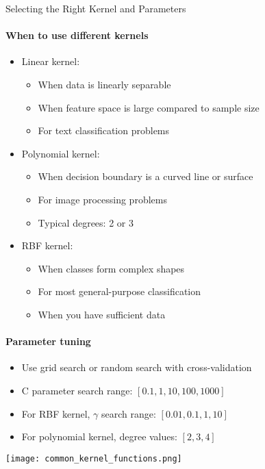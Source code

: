 \begin{KR}{Selecting the Right Kernel and Parameters}

    \begin{minipage}{0.7\linewidth}
\paragraph{When to use different kernels}
\begin{itemize}
    \item Linear kernel: 
    \begin{itemize}
        \item When data is linearly separable
        \item When feature space is large compared to sample size
        \item For text classification problems
    \end{itemize}
    \item Polynomial kernel:
    \begin{itemize}
        \item When decision boundary is a curved line or surface
        \item For image processing problems
        \item Typical degrees: 2 or 3
    \end{itemize}
    \item RBF kernel:
    \begin{itemize}
        \item When classes form complex shapes
        \item For most general-purpose classification
        \item When you have sufficient data
    \end{itemize}
\end{itemize}

\paragraph{Parameter tuning}
\begin{itemize}
    \item Use grid search or random search with cross-validation
    \item C parameter search range: $[0.1, 1, 10, 100, 1000]$
    \item For RBF kernel, $\gamma$ search range: $[0.01, 0.1, 1, 10]$
    \item For polynomial kernel, degree values: $[2, 3, 4]$
\end{itemize}
\end{minipage}
    \begin{minipage}{0.25\linewidth}
        \texttt{[image: common\_kernel\_functions.png]}
    \end{minipage}


\end{KR}
